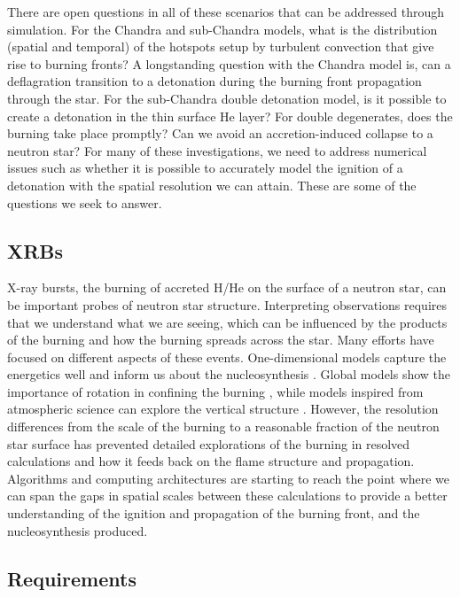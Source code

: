 \documentclass[a4paper]{jpconf}
\begin{document}
There are open questions in all of these scenarios that can be
addressed through simulation.  For the Chandra and sub-Chandra models,
what is the distribution (spatial and temporal) of the hotspots setup
by turbulent convection that give rise to burning fronts?  A
longstanding question with the Chandra model is, can a deflagration
transition to a detonation during the burning front propagation
through the star.  For the sub-Chandra double detonation model, is it
possible to create a detonation in the thin surface He layer?  For
double degenerates, does the burning take place promptly? Can we
avoid an accretion-induced collapse to a neutron star?  For many of
these investigations, we need to address numerical issues such as 
whether it is
possible to accurately model the ignition of a detonation with the
spatial resolution we can attain.  These are some of the questions we
seek to answer.

\subsection{XRBs}

X-ray bursts, the burning of accreted H/He on the surface of a neutron
star, can be important probes of neutron star structure.  Interpreting
observations requires that we understand what we are seeing, which can
be influenced by the products of the burning and how the burning
spreads across the star.  Many efforts have focused on different
aspects of these events.  One-dimensional models capture the
energetics well and inform us about the nucleosynthesis
\cite{woosley-xrb}.  Global models show the importance of rotation in
confining the burning \cite{SPIT_ETAL02}, while models inspired from
atmospheric science can explore the vertical structure
\cite{cavecchi:2012}.  However, the resolution differences from the
scale of the burning to a reasonable fraction of the neutron star
surface has prevented detailed explorations of the burning in resolved
calculations and how it feeds back on the flame structure and
propagation.  Algorithms and computing architectures are starting to
reach the point where we can span the gaps in spatial scales between
these calculations to provide a better understanding of the ignition
and propagation of the burning front, and the nucleosynthesis produced.


\subsection{Requirements}
\end{document}
